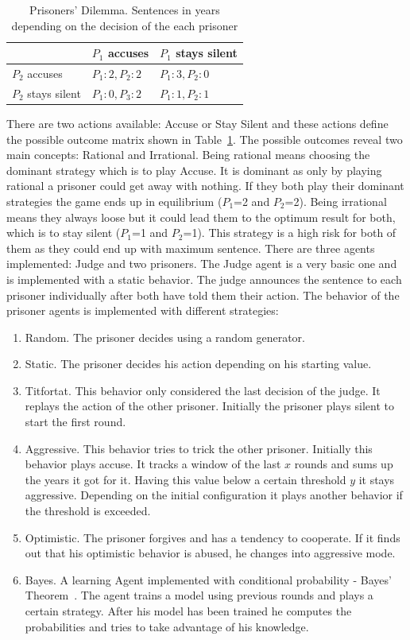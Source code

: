 \documentclass{acm_proc_article-sp}
\begin{document}
\begin{table}
\centering
\begin{tabular}{l | l | l}
                     & $P_1$ accuses    & $P_1$ stays silent\\
  \hline
  $P_2$ accuses      & $P_1: 2, P_2: 2$ & $P_1: 3, P_2: 0$ \\
  \hline
  $P_2$ stays silent & $P_1: 0, P_3: 2$ & $P_1: 1, P_2: 1$ \\
\end{tabular}
\caption{Prisoners' Dilemma. Sentences in years depending on the decision of the each prisoner}
\label{tab:prisoner-opt}
\end{table}

There are two actions available: Accuse or Stay Silent and these actions define the possible outcome matrix shown in Table~\ref{tab:prisoner-opt}. The possible outcomes reveal two main concepts: Rational and Irrational.
Being rational means choosing the dominant strategy which is to play Accuse. It is dominant as only by playing rational a prisoner could get away with nothing. If they both play their dominant strategies the game ends up in equilibrium ($P_1$=2 and $P_2$=2). 
Being irrational means they always loose but it could lead them to the optimum result for both, which is to stay silent ($P_1$=1 and $P_2$=1). This strategy is a high risk for both of them as they could end up with maximum sentence. There are three agents implemented: Judge and two prisoners. The Judge agent is a very basic one and is implemented with a static behavior. The judge announces the sentence 
to each prisoner individually after both have told them their action.
The behavior of the prisoner agents is implemented with different strategies:

\begin{enumerate}
   \item Random. The prisoner decides using a random generator.
   \item Static. The prisoner decides his action depending on his starting value.
   \item Titfortat. This behavior only considered the last decision of the judge. It replays
      the action of the other prisoner. Initially the prisoner plays silent to start the first
      round.
   \item Aggressive. This behavior tries to trick the other prisoner. Initially this
      behavior plays accuse. It tracks a window of the last $x$ rounds and sums up
      the years it got for it. Having this value below a certain threshold $y$ it stays aggressive.
      Depending on the initial configuration it plays another behavior if the threshold
      is exceeded.
   \item Optimistic. The prisoner forgives and has a tendency to cooperate. If it finds out
      that his optimistic behavior is abused, he changes into aggressive mode.
   \item Bayes. A learning Agent implemented with conditional probability - Bayes' Theorem~\cite{gupta2011introduction}.
		The agent trains a model using previous rounds and plays a certain strategy. After his model has been trained he computes the probabilities and tries to take advantage of his knowledge.
\end{enumerate}
\end{document}
